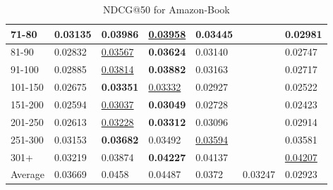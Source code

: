 \begin{table*}[]
\begin{tabular}{|l|l|l|l|l|l|l|}
        71-80   & 0.03135                        & \textbf{0.03986}               & \underline{0.03958}            & 0.03445                        &                                & 0.02981                        \\ \hline
        81-90   & 0.02832                        & \underline{0.03567}            & \textbf{0.03624}               & 0.03140                        &                                & 0.02747                        \\ \hline
        91-100  & 0.02885                        & \underline{0.03814}            & \textbf{0.03882}               & 0.03163                        &                                & 0.02717                        \\ \hline
        101-150 & 0.02675                        & \textbf{0.03351}               & \underline{0.03332}            & 0.02927                        &                                & 0.02522                        \\ \hline
        151-200 & 0.02594                        & \underline{0.03037}            & \textbf{0.03049}               & 0.02728                        &                                & 0.02423                        \\ \hline
        201-250 & 0.02613                        & \underline{0.03228}            & \textbf{0.03312}               & 0.03096                        &                                & 0.02914                        \\ \hline
        251-300 & 0.03153                        & \textbf{0.03682}               & 0.03492                        & \underline{0.03594}            &                                & 0.03581                        \\ \hline
        301+    & 0.03219                        & 0.03874                        & \textbf{0.04227}               & 0.04137                        &                                & \underline{0.04207}            \\ \hline
        Average & 0.03669                        & 0.0458                         & 0.04487                        & 0.0372                         & 0.03247                        & 0.02923                        \\ \hline
    \end{tabular}
    \caption{NDCG@50 for Amazon-Book}
\end{table*}


